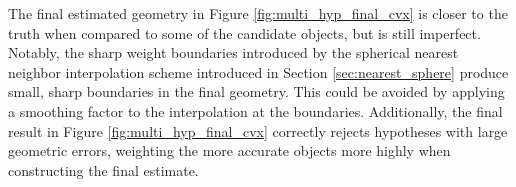The final estimated geometry in Figure \ref{fig:multi_hyp_final_cvx} is closer to the truth when compared to some of the candidate objects, but is still imperfect. Notably, the sharp weight boundaries introduced by the spherical nearest neighbor interpolation scheme introduced in Section \ref{sec:nearest_sphere} produce small, sharp boundaries in the final geometry. This could be avoided by applying a smoothing factor to the interpolation at the boundaries. Additionally, the final result in Figure \ref{fig:multi_hyp_final_cvx} correctly rejects hypotheses with large geometric errors, weighting the more accurate objects more highly when constructing the final estimate.